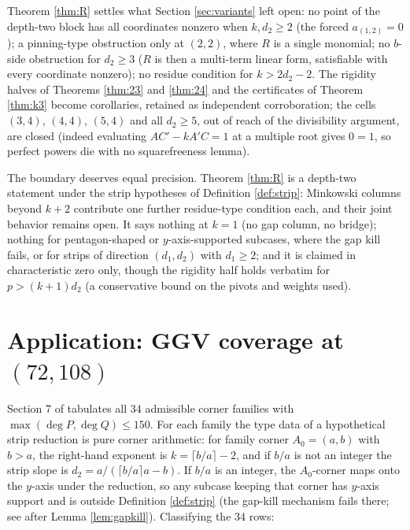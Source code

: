 \documentclass[11pt]{article}
\theoremstyle{definition}
\theoremstyle{remark}
\begin{document}
Theorem \ref{thm:R} settles what Section \ref{sec:variants} left open: no point of the depth-two block has all coordinates nonzero when $k,d_2\geq2$ (the forced $a_{(1,2)}=0$); a pinning-type obstruction only at $(2,2)$, where $R$ is a single monomial; no $b$-side obstruction for $d_2\geq3$ ($R$ is then a multi-term linear form, satisfiable with every coordinate nonzero); no residue condition for $k>2d_2-2$. The rigidity halves of Theorems \ref{thm:23} and \ref{thm:24} and the certificates of Theorem \ref{thm:k3} become corollaries, retained as independent corroboration; the cells $(3,4)$, $(4,4)$, $(5,4)$ and all $d_2\geq5$, out of reach of the divisibility argument, are closed (indeed evaluating $AC'-kA'C=1$ at a multiple root gives $0=1$, so perfect powers die with no squarefreeness lemma).

The boundary deserves equal precision. Theorem \ref{thm:R} is a depth-two statement under the strip hypotheses of Definition \ref{def:strip}: Minkowski columns beyond $k+2$ contribute one further residue-type condition each, and their joint behavior remains open. It says nothing at $k=1$ (no gap column, no bridge); nothing for pentagon-shaped or $y$-axis-supported subcases, where the gap kill fails, or for strips of direction $(d_1,d_2)$ with $d_1\geq2$; and it is claimed in characteristic zero only, though the rigidity half holds verbatim for $p>(k+1)d_2$ (a conservative bound on the pivots and weights used).

\section{Application: GGV coverage at $(72,108)$}\label{sec:coverage}

Section 7 of \cite{GGV4} tabulates all $34$ admissible corner families with $\max(\deg P,\deg Q)\leq150$. For each family the type data of a hypothetical strip reduction is pure corner arithmetic: for family corner $A_0=(a,b)$ with $b>a$, the right-hand exponent is $k=\lceil b/a\rceil-2$, and if $b/a$ is not an integer the strip slope is $d_2=a/(\lceil b/a\rceil a-b)$. If $b/a$ is an integer, the $A_0$-corner maps onto the $y$-axis under the reduction, so any subcase keeping that corner has $y$-axis support and is outside Definition \ref{def:strip} (the gap-kill mechanism fails there; see after Lemma \ref{lem:gapkill}). Classifying the $34$ rows:
\end{document}
